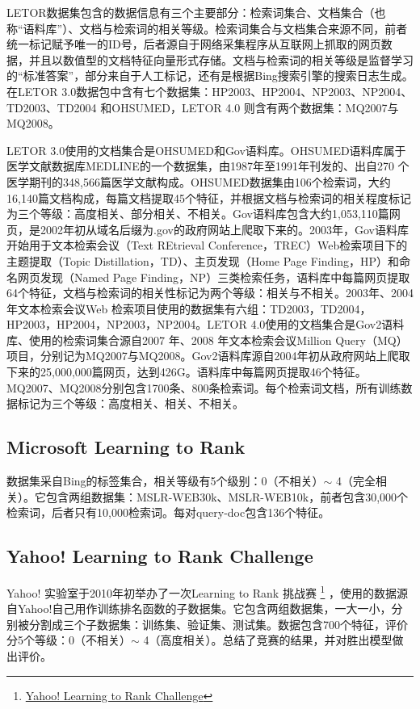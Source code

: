 LETOR数据集包含的数据信息有三个主要部分：检索词集合、文档集合（也称“语料库”）、文档与检索词的相关等级。检索词集合与文档集合来源不同，前者统一标记赋予唯一的ID号，后者源自于网络采集程序从互联网上抓取的网页数据，并且以数值型的文档特征向量形式存储。文档与检索词的相关等级是监督学习的“标准答案”，部分来自于人工标记，还有是根据Bing搜索引擎的搜索日志生成。在LETOR 3.0数据包中含有七个数据集：HP2003、HP2004、NP2003、NP2004、TD2003、TD2004 和OHSUMED，LETOR 4.0 则含有两个数据集：MQ2007与MQ2008。

LETOR 3.0使用的文档集合是OHSUMED和Gov语料库。OHSUMED语料库\cite{hersh1994ohsumed}属于医学文献数据库MEDLINE的一个数据集，由1987年至1991年刊发的、出自270 个医学期刊的348,566篇医学文献构成。OHSUMED数据集由106个检索词，大约16,140篇文档构成，每篇文档提取45个特征，并根据文档与检索词的相关程度标记为三个等级：高度相关、部分相关、不相关。Gov语料库包含大约1,053,110篇网页，是2002年初从域名后缀为.gov的政府网站上爬取下来的。2003年，Gov语料库开始用于文本检索会议（Text REtrieval Conference，TREC）Web检索项目\cite{craswell2003overview}下的主题提取（Topic Distillation，TD）、主页发现（Home Page Finding，HP）和命名网页发现（Named Page Finding，NP）三类检索任务，语料库中每篇网页提取64个特征，文档与检索词的相关性标记为两个等级：相关与不相关。2003年、2004年文本检索会议Web 检索项目使用的数据集有六组：TD2003，TD2004，HP2003，HP2004，NP2003，NP2004。LETOR 4.0使用的文档集合是Gov2语料库、使用的检索词集合源自2007 年、2008 年文本检索会议Million Query（MQ）项目，分别记为MQ2007与MQ2008。Gov2语料库源自2004年初从政府网站上爬取下来的25,000,000篇网页，达到426G。语料库中每篇网页提取46个特征。MQ2007、MQ2008分别包含1700条、800条检索词。每个检索词文档，所有训练数据标记为三个等级：高度相关、相关、不相关。

\subsection{Microsoft Learning to Rank}
数据集采自Bing的标签集合，相关等级有5个级别：0（不相关）$\sim$ 4（完全相关）。它包含两组数据集：MSLR-WEB30k、MSLR-WEB10k，前者包含30,000个检索词，后者只有10,000检索词。每对query-doc包含136个特征。

\subsection{Yahoo! Learning to Rank Challenge}
Yahoo! 实验室于2010年初举办了一次Learning to Rank 挑战赛
\footnote{\href{http://webscope.sandbox.yahoo.com/catalog.php?datatype=c}{Yahoo! Learning to Rank Challenge}}
，使用的数据源自Yahoo!自己用作训练排名函数的子数据集。它包含两组数据集，一大一小，分别被分割成三个子数据集：训练集、验证集、测试集。数据包含700个特征，评价分5个等级：0（不相关）$\sim$ 4（高度相关）。\cite{chapelle2011yahoo}总结了竞赛的结果，并对胜出模型做出评价。

